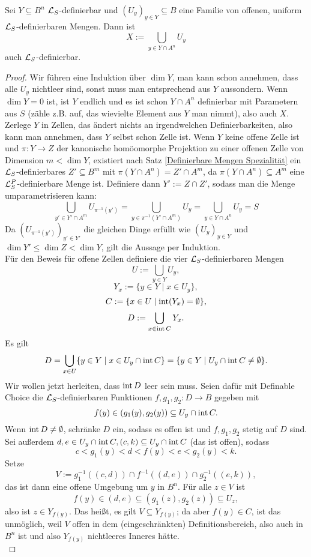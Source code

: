 \begin{lemma}
	Sei $Y\subseteq B^n$ $\mathcal{L}_S$-definierbar und $(U_y)_{y\in Y}\subseteq B$ eine Familie von offenen, uniform $\mathcal{L}_S$-definierbaren Mengen. Dann ist $$X:=\bigcup\limits_{y\in Y\cap A^n}U_y$$ auch $\mathcal{L}_S$-definierbar.
\end{lemma}
\begin{proof}
	Wir führen eine Induktion über $\dim Y$, man kann schon annehmen, dass alle $U_y$ nichtleer sind, sonst muss man entsprechend aus $Y$ aussondern. Wenn $\dim Y=0$ ist, ist $Y$ endlich und es ist schon $Y\cap A^n$ definierbar mit Parametern aus $S$ (zähle z.B. auf, das wievielte Element aus $Y$ man nimmt), also auch $X$.\\
	Zerlege $Y$ in Zellen, das ändert nichts an irgendwelchen Definierbarkeiten, also kann man annehmen, dass $Y$ selbst schon Zelle ist. Wenn $Y$ keine offene Zelle ist und $\pi:Y\rightarrow Z$ der kanonische homöomorphe Projektion zu einer offenen Zelle von Dimension $m<\dim Y$, existiert nach Satz \ref{Definierbare Mengen Spezialität} ein $\mathcal{L}_S$-definierbares $Z'\subseteq B^m$ mit $\pi(Y\cap A^n)=Z'\cap A^m$, da $\pi(Y\cap A^n)\subseteq A^m$ eine $\mathcal{L}^P_S$-definierbare Menge ist. Definiere dann $Y':=Z\cap Z'$, sodass man die Menge umparametrisieren kann:
	$$\bigcup\limits_{y'\in Y'\cap A^m}U_{\pi^{-1}(y')}=\bigcup\limits_{y\in\pi^{-1}(Y'\cap A^m)}U_y=\bigcup\limits_{y\in Y\cap A^n}U_y=S$$
	Da $(U_{\pi^{-1}(y')})_{y'\in Y'}$ die gleichen Dinge erfüllt wie $(U_y)_{y\in Y}$ und $\dim Y'\leq\dim Z<\dim Y$, gilt die Aussage per Induktion.\\
	Für den Beweis für offene Zellen definiere die vier $\mathcal{L}_S$-definierbaren Mengen $$U:=\bigcup\limits_{y\in Y}U_y,$$ $$Y_x:=\{y\in Y\mid x\in U_y\},$$ $$C:=\{x\in U\mid\operatorname{int}(Y_x)=\emptyset\},$$ $$D:=\bigcup\limits_{x\in\operatorname{int} C}Y_x.$$
	Es gilt $$D=\bigcup\limits_{x\in U}\{y\in Y\mid x\in U_y\cap\operatorname{int} C\}=\{y\in Y\mid U_y\cap\operatorname{int} C\neq\emptyset\}.$$
	Wir wollen jetzt herleiten, dass $\operatorname{int} D$ leer sein muss. Seien dafür mit Definable Choice die $\mathcal{L}_S$-definierbaren Funktionen $f,g_1,g_2:D\rightarrow B$ gegeben mit $$f(y)\in(g_1(y),g_2(y))\subseteq U_y\cap\operatorname{int} C.$$
	Wenn $\operatorname{int} D\neq\emptyset$, schränke $D$ ein, sodass es offen ist und $f,g_1,g_2$ stetig auf $D$ sind. Sei außerdem $d,e\in U_y\cap\operatorname{int} C, (c,k)\subseteq U_y\cap\operatorname{int} C$ (das ist offen), sodass $$c<g_1(y)<d<f(y)<e<g_2(y)<k.$$ Setze $$V:=g_1^{-1}((c,d))\cap f^{-1}((d,e))\cap g_2^{-1}((e,k)),$$ das ist dann eine offene Umgebung um $y$ in $B^n$. Für alle $z\in V$ ist $$f(y)\in(d,e)\subseteq(g_1(z),g_2(z))\subseteq U_z,$$ also ist $z\in Y_{f(y)}$. Das heißt, es gilt $V\subseteq Y_{f(y)}$; da aber $f(y)\in C$, ist das unmöglich, weil $V$ offen in dem (eingeschränkten) Definitionsbereich, also auch in $B^n$ ist und also $Y_{f(y)}$ nichtleeres Inneres hätte.\\

\end{proof}
